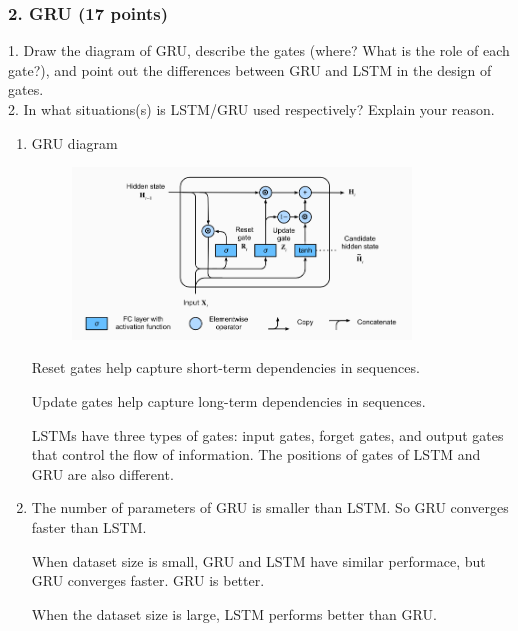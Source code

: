 \documentclass[12pt]{article}%
\begin{document}
\newpage


\subsubsection*{2. GRU (17 points)}

1. Draw the diagram of GRU, describe the gates (where? What is the role of each gate?), and point out the differences between GRU and LSTM in the design of gates.\\
2. In what situations(s) is LSTM/GRU used respectively? Explain your reason.
\begin{enumerate}
	\item GRU diagram

	\begin{figure}[H]
		\centering
		\includegraphics[width=0.85\textwidth]{./gru.png}
	\end{figure}
	Reset gates help capture short-term dependencies in sequences.

	Update gates help capture long-term dependencies in sequences.

	LSTMs have three types of gates: input gates, forget gates, and output gates that control the flow of information.
	The positions of gates of LSTM and GRU are also different.
	\item   
	The number of parameters of GRU is smaller than LSTM. So GRU converges faster than LSTM. 

	When dataset size is small, GRU and LSTM have similar performace, but GRU converges faster. GRU is better.  
	
	When the dataset size is large, LSTM performs better than GRU.
\end{enumerate}


\newpage
\end{document}
